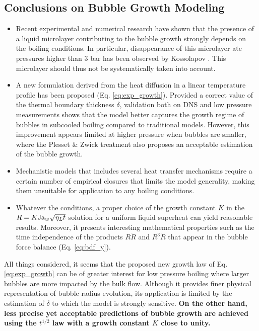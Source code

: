 \subsection{Conclusions on Bubble Growth Modeling}

\begin{itemize}

\item Recent experimental and numerical research have shown that the presence of a liquid microlayer contributing to the bubble growth strongly depends on the boiling conditions. In particular, disappearance of this microlayer ate pressures higher than $3$ bar has been observed by Kossolapov \cite{kossolapov_experimental_2021}. This microlayer should thus not be systematically taken into account.

\item A new formulation derived from the heat diffusion in a linear temperature profile has been proposed (Eq. \ref{eq:exp_growth}). Provided a correct value of the thermal boundary thickness $\delta$, validation both on DNS and low pressure measurements shows that the model better captures the growth regime of bubbles in subcooled boiling compared to traditional models. However, this improvement appears limited at higher pressure when bubbles are smaller, where the Plesset \& Zwick treatment also proposes an acceptable estimation of the bubble growth.

\item Mechanistic models that includes several heat transfer mechanisms require a certain number of empirical closures that limits the model generality, making them unsuitable for application to any boiling conditions.

\item Whatever the conditions, a proper choice of the growth constant $K$ in the $R=K\mathrm{Ja}_{w} \sqrt{\eta_{L}t}$ solution for a uniform liquid superheat can yield reasonable results. Moreover, it presents interesting mathematical properties such as the time independence of the products $R \dot{R}$ and $R^{3}\ddot{R}$ that appear in the bubble force balance (Eq. \ref{eq:bdf_y}).

\end{itemize}

All things considered, it seems that the proposed new growth law of Eq. \ref{eq:exp_growth} can be of greater interest for low pressure boiling where larger bubbles are more impacted by the bulk flow. Although it provides finer physical representation of bubble radius evolution, its application is limited by the estimation of $\delta$ to which the model is strongly sensitive. \textbf{On the other hand, less precise yet acceptable predictions of bubble growth are achieved using the $t^{1/2}$ law with a growth constant $K$ close to unity.}




